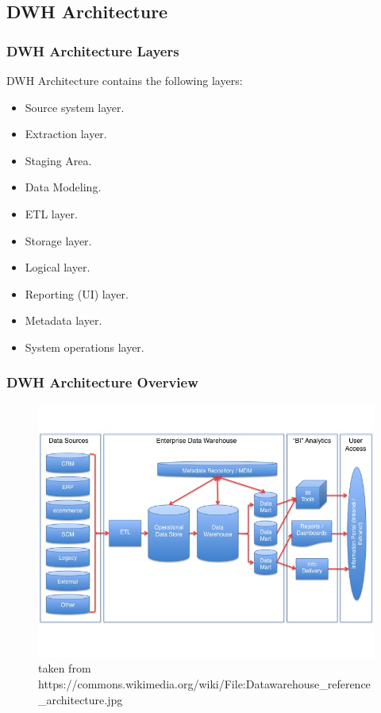 \subsection{DWH Architecture}
\begin{frame}
\frametitle{DWH Architecture Layers}

\begin{wideitemize}
	\item DWH Architecture contains the following layers:
	\begin{itemize}[<+->]
		\item Source system layer.
		\item Extraction layer.
		\item Staging Area.
		\item Data Modeling.
		\item ETL layer.
		\item Storage layer.
		\item Logical layer.
		\item Reporting (UI) layer.
		\item Metadata layer.
		\item System operations layer.
	\end{itemize}	
\end{wideitemize}

\end{frame}

\begin{frame}
\frametitle{DWH Architecture Overview}
\begin{figure}[ht]
	
	\centering
	\includegraphics[width=.9\linewidth,height=.8\textheight]{./Figures/chapter-01/Datawarehouse_reference_architecture.jpg}
	\caption{taken from https://commons.wikimedia.org/wiki/File:Datawarehouse\_reference\_architecture.jpg}
\end{figure}
\end{frame}

